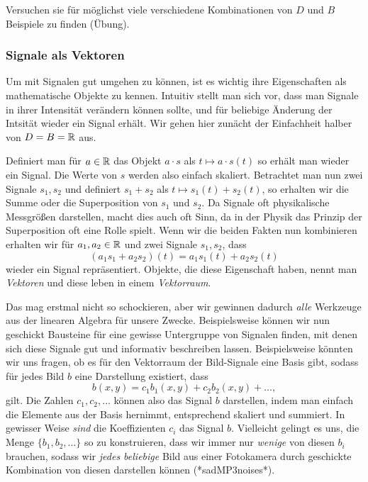 Versuchen sie f\"ur m\"oglichst viele verschiedene Kombinationen von $D$ und $B$ Beispiele zu finden (\"Ubung).
%
\subsubsection{Signale als Vektoren}
%
Um mit Signalen gut umgehen zu k\"onnen, ist es wichtig ihre Eigenschaften als mathematische Objekte zu kennen.
Intuitiv stellt man sich vor, dass man Signale in ihrer Intensit\"at ver\"andern k\"onnen sollte, und f\"ur beliebige \"Anderung der Intsit\"at wieder ein Signal erh\"alt.
Wir gehen hier zun\"acht der Einfachheit halber von $D = B = \mathbb{R}$ aus.

Definiert man f\"ur $a \in \mathbb{R}$ das Objekt $a \cdot s$ als $t \mapsto a \cdot s(t)$ so erh\"alt man wieder ein Signal.
Die Werte von $s$ werden also einfach skaliert.
Betrachtet man nun zwei Signale $s_1, s_2$ und definiert $s_1 + s_2$ als $t \mapsto s_1(t) + s_2(t)$, so erhalten wir die Summe oder die Superposition von $s_1$ und $s_2$.
Da Signale oft physikalische Messgr\"o\ss{}en darstellen, macht dies auch oft Sinn, da in der Physik das Prinzip der Superposition oft eine Rolle spielt.
Wenn wir die beiden Fakten nun kombinieren erhalten wir f\"ur $a_1, a_2 \in \mathbb{R}$ und zwei Signale $s_1, s_2$, dass
\[
(a_1 s_1 + a_2 s_2)(t) = a_1 s_1(t) + a_2 s_2(t)
\]
wieder ein Signal repr\"asentiert.
Objekte, die diese Eigenschaft haben, nennt man \emph{Vektoren} und diese leben in einem \emph{Vektorraum}.

Das mag erstmal nicht so schockieren, aber wir gewinnen dadurch \emph{alle} Werkzeuge aus der linearen Algebra f\"ur unsere Zwecke.
Beispielsweise k\"onnen wir nun geschickt Bausteine f\"ur eine gewisse Untergruppe von Signalen finden, mit denen sich diese Signale gut und informativ beschreiben lassen.
Beispielsweise k\"onnten wir uns fragen, ob es f\"ur den Vektorraum der Bild-Signale eine Basis gibt, sodass f\"ur jedes Bild $b$ eine Darstellung existiert, dass
\[
b(x,y) = c_1 b_1(x,y) + c_2 b_2(x,y) + \dots,
\]
gilt. 
Die Zahlen $c_1, c_2, \dots$ k\"onnen also das Signal $b$ darstellen, indem man einfach die Elemente aus der Basis hernimmt, entsprechend skaliert und summiert.
In gewisser Weise \emph{sind} die Koeffizienten $c_i$ das Signal $b$.
Vielleicht gelingt es uns, die Menge $\{b_1, b_2, \dots\}$ so zu konstruieren, dass wir immer nur \emph{wenige} von diesen $b_i$ brauchen, sodass wir \emph{jedes beliebige} Bild aus einer Fotokamera durch geschickte Kombination von diesen darstellen k\"onnen (*sadMP3noises*). 
%
